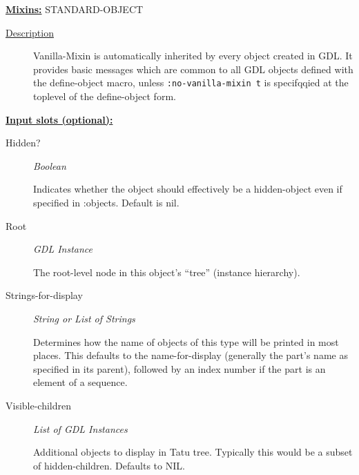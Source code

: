 \documentclass [11pt]{book}
\begin{document}
\begin{itemize}
\textbf{
\underline{Mixins:}} STANDARD-OBJECT





\begin{description}

\item [
\underline{Description}]


Vanilla-Mixin is automatically inherited by every object
created in GDL. It provides basic messages which are common to all GDL objects defined
with the define-object macro, unless \texttt{:no-vanilla-mixin t} is specifqqied at the toplevel
of the define-object form.



\end{description}








\textbf{
\underline{Input slots (optional):}}

\begin{description}

\item [Hidden?]
\emph{Boolean}

 Indicates whether the object should effectively be a hidden-object even if specified in :objects. Default is nil.




\item [Root]
\emph{GDL Instance}

 The root-level node in this object's ``tree'' (instance hierarchy).




\item [Strings-for-display]
\emph{String or List of Strings}

 Determines how the name of objects of this type will be printed in most places.
This defaults to the name-for-display (generally the part's name as specified in its
parent), followed by an index number if the part is an element of a sequence.




\item [Visible-children]
\emph{List of GDL Instances}

 Additional objects to display in Tatu tree. Typically this would be a subset of hidden-children. Defaults to NIL.





\end{description}
\end{itemize}
\end{document}
